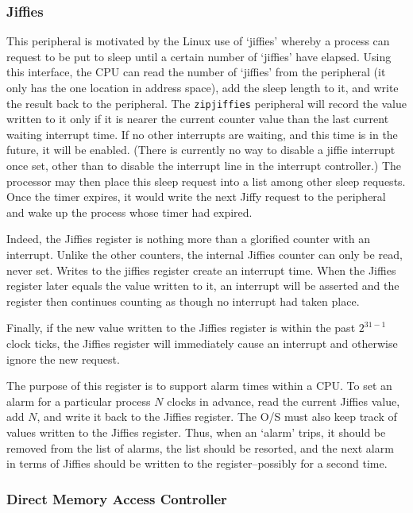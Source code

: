 \documentclass{gqtekspec}
\begin{document}
\subsubsection{Jiffies}

This peripheral is motivated by the Linux use of `jiffies' whereby a process
can request to be put to sleep until a certain number of `jiffies' have
elapsed.  Using this interface, the CPU can read the number of `jiffies'
from the peripheral (it only has the one location in address space), add the
sleep length to it, and write the result back to the peripheral.  The
{\tt zipjiffies}
peripheral will record the value written to it only if it is nearer the current
counter value than the last current waiting interrupt time.  If no other 
interrupts are waiting, and this time is in the future, it will be enabled.
(There is currently no way to disable a jiffie interrupt once set, other
than to disable the interrupt line in the interrupt controller.)  The processor
may then place this sleep request into a list among other sleep requests.
Once the timer expires, it would write the next Jiffy request to the peripheral
and wake up the process whose timer had expired.

Indeed, the Jiffies register is nothing more than a glorified counter with
an interrupt.  Unlike the other counters, the internal Jiffies counter can only
be read, never set.
Writes to the jiffies register create an interrupt time.  When the Jiffies
register later equals the value written to it, an interrupt will be asserted
and the register then continues counting as though no interrupt had taken
place.

Finally, if the new value written to the Jiffies register is within the past
$2^{31-1}$ clock ticks, the Jiffies register will immediately cause an interrupt
and otherwise ignore the new request.

The purpose of this register is to support alarm times within a CPU.  To
set an alarm for a particular process $N$ clocks in advance, read the current
Jiffies value, add $N$, and write it back to the Jiffies register.  The
O/S must also keep track of values written to the Jiffies register.  Thus,
when an `alarm' trips, it should be removed from the list of alarms, the list
should be resorted, and the next alarm in terms of Jiffies should be written
to the register--possibly for a second time.

\subsubsection{Direct Memory Access Controller}
\end{document}
